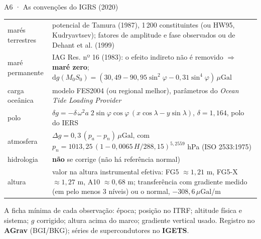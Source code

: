 \documentclass[aspectratio=169,11pt]{beamer}
\newcommand{\uGal}{\ensuremath{\,\mu\mathrm{Gal}}\xspace}
\begin{document}
\begin{frame}{A6 · As convenções do IGRS (2020)}
  \scriptsize
  \renewcommand{\arraystretch}{1.3}
  \centering
  \begin{tabular}{lp{10.2cm}}
    \toprule
    marés terrestres & potencial de Tamura (1987), 1\,200 constituintes (ou HW95,
      Kudryavtsev); fatores de amplitude e fase observados ou de Dehant et al. (1999) \\
    maré permanente & IAG Res. nº 16 (1983): o efeito indireto não é removido $\Rightarrow$
      \textbf{maré zero}; $\mathrm{d}g(M_0S_0) = (30{,}49 - 90{,}95\sin^2\varphi -
      0{,}31\sin^4\varphi)$\uGal \\
    carga oceânica & modelo FES2004 (ou regional melhor), parâmetros do \emph{Ocean Tide
      Loading Provider} \\
    polo & $\delta g = -\delta\,\omega^2 a\; 2\sin\varphi\cos\varphi\,(x\cos\lambda -
      y\sin\lambda)$, $\delta = 1{,}164$, polo do IERS \\
    atmosfera & $\Delta g = 0{,}3\,(p_a - p_n)$\uGal, com
      $p_n = 1013{,}25\,(1 - 0{,}0065\,H/288{,}15)^{5{,}2559}$ hPa (ISO 2533:1975) \\
    hidrologia & \textbf{não} se corrige (não há referência normal) \\
    altura & valor na altura instrumental efetiva: FG5 $\approx 1{,}21$ m, FG5-X
      $\approx 1{,}27$ m, A10 $\approx 0{,}68$ m; transferência com gradiente medido (em
      pelo menos 3 níveis) ou o normal, $-308{,}6$\uGal/m \\
    \bottomrule
  \end{tabular}
  \medskip
  \flushleft
  A ficha mínima de cada observação: época; posição no ITRF; altitude física e sistema; $g$
  corrigido; altura acima do marco; gradiente vertical usado. Registro no \textbf{AGrav}
  (BGI/BKG); séries de supercondutores no \textbf{IGETS}.
\end{frame}
\end{document}
